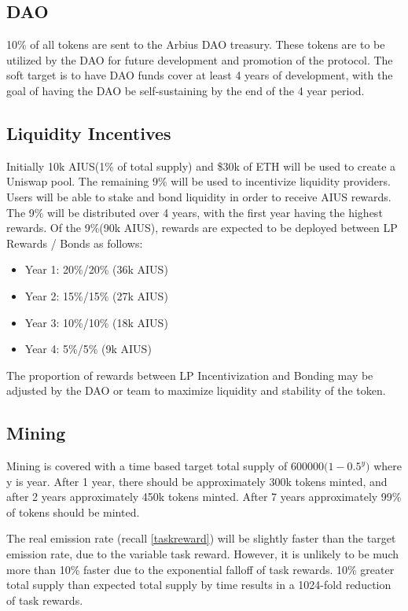 \documentclass{article}
\begin{document}
\subsection{DAO}

10\% of all tokens are sent to the Arbius DAO treasury. These tokens are to be utilized by the DAO for future development and promotion of the protocol. The soft target is to have DAO funds cover at least 4 years of development, with the goal of having the DAO be self-sustaining by the end of the 4 year period.

\subsection{Liquidity Incentives}

Initially 10k AIUS(1\% of total supply) and \$30k of ETH will be used to create a Uniswap pool. The remaining 9\% will be used to incentivize liquidity providers. Users will be able to stake and bond liquidity in order to receive AIUS rewards. The 9\% will be distributed over 4 years, with the first year having the highest rewards. Of the 9\%(90k AIUS), rewards are expected to be deployed between LP Rewards / Bonds as follows:

\begin{itemize}
    \item Year 1: 20\%/20\% (36k AIUS)
    \item Year 2: 15\%/15\% (27k AIUS)
    \item Year 3: 10\%/10\% (18k AIUS)
    \item Year 4: 5\%/5\% (9k AIUS)
\end{itemize}

The proportion of rewards between LP Incentivization and Bonding may be adjusted by the DAO or team to maximize liquidity and stability of the token.


\subsection{Mining}

Mining is covered with a time based target total supply of $600000(1-{0.5^{y})}$ where y is year. After 1 year, there should be approximately 300k tokens minted, and after 2 years approximately 450k tokens minted. After 7 years approximately 99\% of tokens should be minted.

The real emission rate (recall \ref{taskreward}) will be slightly faster than the target emission rate, due to the variable task reward. However, it is unlikely to be much more than 10\% faster due to the exponential falloff of task rewards. 10\% greater total supply than expected total supply by time results in a 1024-fold reduction of task rewards.
\end{document}
